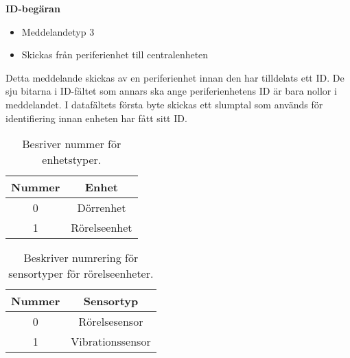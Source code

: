 \textbf{ID-begäran}
\begin{itemize}
    \item Meddelandetyp 3
    \item Skickas från periferienhet till centralenheten
\end{itemize}
Detta meddelande skickas av en periferienhet innan den har tilldelats ett ID. 
De sju bitarna i ID-fältet som annars ska ange periferienhetens ID är bara nollor i meddelandet.
 I datafältets första byte skickas ett slumptal som används för identifiering 
 innan enheten har fått sitt ID.\\
\begin{table}[htb]
	\centering
	\begin{tabular}{|c|c|}
		\hline
		Nummer & Enhet \\ \hline \hline
		0 & Dörrenhet \\ \hline
		1 & Rörelseenhet \\ \hline

	\end{tabular}
	\caption{Besriver nummer för enhetstyper.}
	\label{tab:enhetstyper}
\end{table}

\begin{table}[htb]
	\centering
	\begin{tabular}{|c|c|}
		\hline
		Nummer & Sensortyp \\ \hline \hline
		0 & Rörelsesensor \\ \hline
		1 & Vibrationssensor \\ \hline

	\end{tabular}
	\caption{Beskriver numrering för sensortyper för rörelseenheter.}
	\label{tab:sensortyper}
\end{table}
